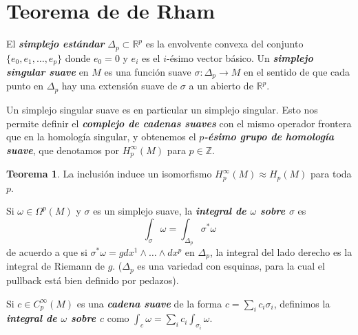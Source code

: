 \documentclass[spanish]{article}
\theoremstyle{definition}
\newtheorem*{teo}{Teorema}
\newcommand{\R}{\mathbb{R}}
\newcommand{\Z}{\mathbb{Z}}
\begin{document}
	
	\section{Teorema de de Rham}\label{sec:5}
	
	El \textbf{\textit{simplejo estándar}} $\Delta_p\subset\R^p$ es la envolvente convexa del conjunto $\{e_0,e_1,\ldots,e_p\}$ donde $e_0=0$ y $e_i$ es el $i$-ésimo vector básico. Un \textbf{\textit{simplejo singular suave}} en $M$ es una función suave $\sigma:\Delta_p\to M$ en el sentido de que cada punto en $\Delta_p$ hay una extensión suave de $\sigma$ a un abierto de $\R^p$.
	
	Un simplejo singular suave es en particular un simplejo singular. Esto nos permite definir el \textbf{\textit{complejo de cadenas suaves}} con el mismo operador frontera que en la homología singular, y obtenemos el \textbf{\textit{$p$-ésimo grupo de homología suave}}, que denotamos por $H^\infty_p(M)$ para $p\in\Z$.
	\begin{teo}
		La inclusión induce un isomorfismo $H^\infty_p(M)\approx H_p(M)$ para toda $p$.
	\end{teo}
	
	Si $\omega\in\Omega^p(M)$ y $\sigma$ es un simplejo suave, la \textbf{\textit{integral de $\omega$ sobre $\sigma$}} es
	\[\int_\sigma \omega=\int_{\Delta_p}\sigma^*\omega\]
	de acuerdo a que si $\sigma^*\omega=gdx^1\wedge\ldots\wedge dx^p$ en $\Delta_p$, la integral del lado derecho es la integral de Riemann de $g$. ($\Delta_p$ es una variedad con esquinas, para la cual el pullback está bien definido por pedazos).
	
	Si $c\in C_p^\infty(M)$ es una \textbf{\textit{cadena suave}} de la forma $c=\sum_ic_i\sigma_i$, definimos la \textbf{\textit{integral de $\omega$ sobre $c$}} como $\int_c\omega=\sum_ic_i\int_{\sigma_i}\omega$.
	
\end{document}
